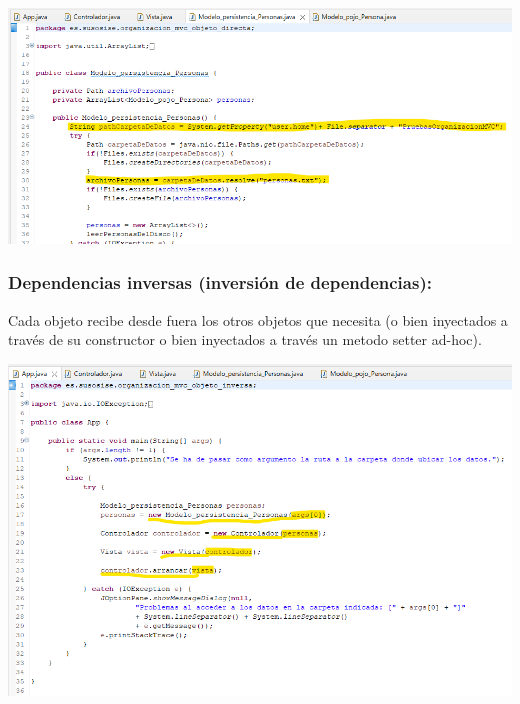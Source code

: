 \documentclass[spanish,12pt,a4paper,final,oneside]{book}
\begin{document}
\includegraphics[width=\textwidth]{MVC_directa_Persistencia} 











\subsubsection*{Dependencias inversas (inversión de dependencias):}
Cada objeto recibe desde fuera los otros objetos que necesita (o bien inyectados a través de su constructor o bien inyectados a través un metodo setter ad-hoc).

\includegraphics[width=\textwidth]{MVC_inversa_App} 
\end{document}
